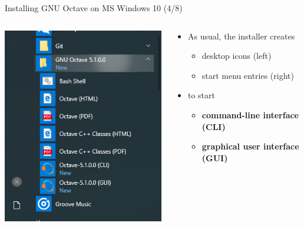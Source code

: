 \begin{frame}{Installing GNU Octave on MS Windows 10 (4/8)}
\begin{columns}
\begin{column}{0.3\textwidth}
\includegraphics[width=\textwidth]{res/ms_windows/win_install_startmenu_icons.png}
\end{column}
\begin{column}{0.45\textwidth}
\begin{itemize}
\itemsep1em
\item
As usual, the installer creates
\begin{itemize}
\itemsep0.6em
\item
desktop icons (left)
\item
start menu entries (right)
\end{itemize}
\item
to start
\begin{itemize}
\itemsep0.6em
\item
\textbf{command-line interface (CLI)}
\item
\textbf{graphical user interface (GUI)}
\end{itemize}
\end{itemize}
\end{column}
\end{columns}
\end{frame}



